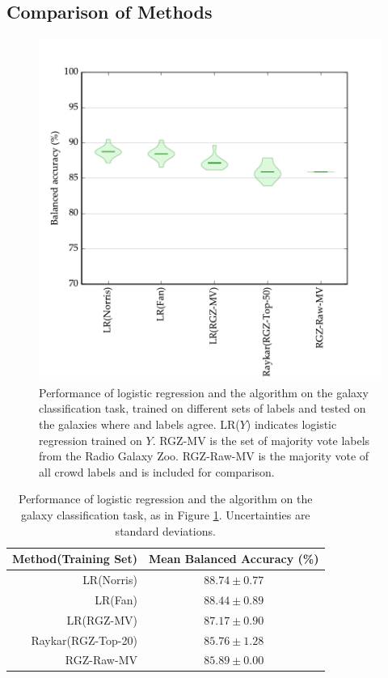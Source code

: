   \subsection{Comparison of Methods}
  \label{sec:comparison-predictors}

    \begin{figure}
      \centering
      \includegraphics[width=\textwidth]{images/experiments/predictors.pdf}
      \caption{Performance of logistic regression and the \citeauthor{raykar10}
        algorithm on the galaxy classification task, trained on different sets of
        labels and tested on the galaxies where \citeauthor{norris06} and
        \citeauthor{fan15} labels agree. LR($Y$) indicates logistic regression
        trained on $Y$. RGZ-MV is the set of majority vote labels from the Radio
        Galaxy Zoo. RGZ-Raw-MV is the majority vote of all crowd labels and is
        included for comparison.}
      \label{fig:predictors}
    \end{figure}

    \begin{table}
      \centering
      \begin{tabular}{r|c}
        \textbf{Method(Training Set)} & \textbf{Mean Balanced Accuracy (\%)}\\\hline
        LR(Norris) & $88.74 \pm 0.77$\\
        LR(Fan) & $88.44 \pm 0.89$\\
        LR(RGZ-MV) & $87.17 \pm 0.90$\\
        Raykar(RGZ-Top-20) & $85.76 \pm 1.28$\\
        RGZ-Raw-MV & $85.89 \pm 0.00$\\
      \end{tabular}
      \caption{Performance of logistic regression and the \citeauthor{raykar10}
        algorithm on the galaxy classification task, as in Figure
        \ref{fig:predictors}. Uncertainties are standard deviations.}
      \label{tab:predictors}
    \end{table}

